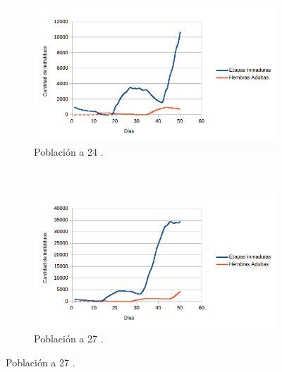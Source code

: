\begin{figure}[!htbp]
    \begin{subfigure}[b]{0.45\textwidth}
            \includegraphics[width=\textwidth]{capitulo-6/graphics/desarrollo-poblacion-24.png}
            \caption{\label{fig:desarrollo-poblacion-24}Población a 24 \textcelsius.}
    \end{subfigure}
    ~~~~
    \begin{subfigure}[b]{0.45\textwidth}
            \includegraphics[width=\textwidth]{capitulo-6/graphics/desarrollo-poblacion-27.png}
            \caption{\label{fig:desarrollo-poblacion-27}Población a 27 \textcelsius.}
    \end{subfigure}


\end{figure}
